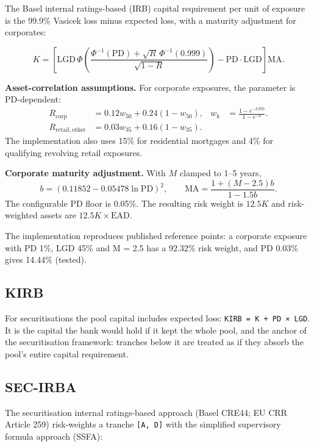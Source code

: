 \documentclass[10pt,a4paper]{article}
\numberwithin{equation}{section}
\begin{document}
The Basel internal ratings-based (IRB) capital requirement per unit of exposure is the 99.9\% Vasicek loss minus expected loss, with a maturity adjustment for corporates:

\begin{equation}
K=\left[\mathrm{LGD}\,\Phi\!\left(\frac{\Phi^{-1}(\mathrm{PD})+
\sqrt{R}\,\Phi^{-1}(0.999)}{\sqrt{1-R}}\right)-\mathrm{PD}\cdot\mathrm{LGD}\right]
\mathrm{MA}.
\end{equation}

\noindent\textbf{Asset-correlation assumptions.} For corporate exposures, the parameter is PD-dependent:
\begin{align}
R_{\mathrm{corp}}&=0.12w_{50}+0.24(1-w_{50}), &
 w_{k}&=\frac{1-e^{-k\,\mathrm{PD}}}{1-e^{-k}}. \\
R_{\mathrm{retail,other}}&=0.03w_{35}+0.16(1-w_{35}).
\end{align}
The implementation also uses 15\% for residential mortgages and 4\% for qualifying revolving retail exposures.

\noindent\textbf{Corporate maturity adjustment.} With $M$ clamped to 1--5 years,
\begin{equation}
b=(0.11852-0.05478\ln\mathrm{PD})^2,\qquad
\mathrm{MA}=\frac{1+(M-2.5)b}{1-1.5b}.
\end{equation}
The configurable PD floor is 0.05\%. The resulting risk weight is $12.5K$ and risk-weighted assets are $12.5K\times\mathrm{EAD}$.

The implementation reproduces published reference points: a corporate exposure with PD 1\%, LGD 45\% and M = 2.5 has a 92.32\% risk weight, and PD 0.03\% gives 14.44\% (tested).

\subsection{KIRB}\label{kirb}

For securitisations the pool capital includes expected loss: \texttt{KIRB\ =\ K\ +\ PD\ ×\ LGD}. It is the capital the bank would hold if it kept the whole pool, and the anchor of the securitisation framework: tranches below it are treated as if they absorb the pool's entire capital requirement.

\subsection{SEC-IRBA}\label{sec-irba}

The securitisation internal ratings-based approach (Basel CRE44; EU CRR Article 259) risk-weights a tranche \texttt{{[}A,\ D{]}} with the simplified supervisory formula approach (SSFA):
\end{document}
